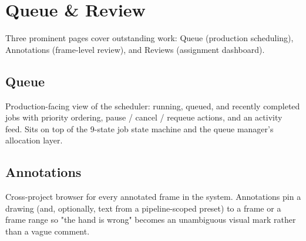 \chapter{Queue \& Review}
\label{ch:queue-review}

Three prominent pages cover outstanding work: Queue (production scheduling),
Annotations (frame-level review), and Reviews (assignment dashboard).

\section{Queue}
\label{sec:queue}

Production-facing view of the scheduler: running, queued, and recently completed
jobs with priority ordering, pause / cancel / requeue actions, and an activity
feed. Sits on top of the 9-state job state machine and the queue manager's
allocation layer.


\begin{itemize}
\end{itemize}

\section{Annotations}
\label{sec:annotations}

Cross-project browser for every annotated frame in the system. Annotations pin a
drawing (and, optionally, text from a pipeline-scoped preset) to a frame or a
frame range so "the hand is wrong" becomes an unambiguous visual mark rather
than a vague comment.


